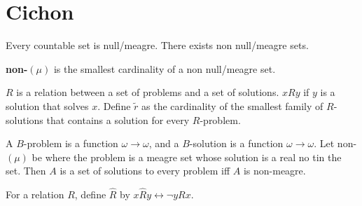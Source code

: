 \section{Cichon}
  \begin{fact}
    Every countable set is null/meagre. There exists non null/meagre sets.
  \end{fact}

  \begin{definition}
    \textbf{non-$(\mu)$} is the smallest cardinality of a non null/meagre set.
  \end{definition}

  \begin{definition}
    $R$ is a relation between a set of problems and a set of solutions.
    $xRy$ if $y$ is a solution that solves $x$. Define $\tilde{r}$ as the
    cardinality of the smallest family of $R$-solutions that contains a
    solution for every $R$-problem.
  \end{definition}

  \begin{example}
    A $B$-problem is a function $\omega\rightarrow\omega$, and
    a $B$-solution is a function $\omega\rightarrow\omega$. Let non-$(\mu)$
    be where the problem is a meagre set whose solution is a real no tin
    the set. Then $A$ is a set of solutions to every problem iff $A$ is
    non-meagre.
  \end{example}

  \begin{definition}
    For a relation $R$, define $\hat{R}$ by $x\hat{R}y \leftrightarrow \neg
    yRx$.
  \end{definition}
